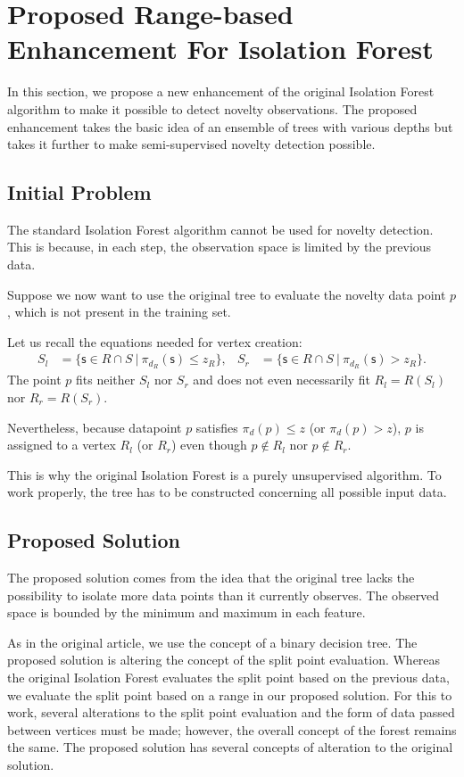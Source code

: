 \section{Proposed Range-based Enhancement For Isolation Forest}
\label{sec:novelty_isolation_forest}
In this section, we propose a new enhancement of the original Isolation Forest algorithm to make it possible to detect novelty observations.
The proposed enhancement takes the basic idea of an ensemble of trees with various depths but takes it further to make semi-supervised novelty detection possible.

\subsection{Initial Problem}
\label{sec:InitialProblem}
 The standard Isolation Forest algorithm cannot be used for novelty detection. This is because, in each step, the observation space is limited by the previous data.


Suppose we now want to use the original tree to evaluate the novelty data point $p$, which is not present in the training set.

Let us recall the equations needed for vertex creation:
\begin{align*}
S_l &= \{ \mathsf{s} \in{R \cap S}\ |\ \pi_{d_R}(\mathsf{s})\le z_R\},&
S_r &= \{ \mathsf{s} \in{R \cap S}\ |\ \pi_{d_R}(\mathsf{s}) > z_R\}.
\end{align*}
The point $p$ fits neither $S_l$ nor $S_r$ and does not even necessarily fit $R_l = R(S_l)$ nor $R_r = R(S_r)$. 

Nevertheless, because datapoint $p$ satisfies  $\pi_d(p) \le z$ (or $\pi_d(p) > z$), $p$ is assigned to a vertex $R_l$ (or $R_r$) even though $p \notin R_l$ nor $p \notin R_r$.

This is why the original Isolation Forest is a purely unsupervised algorithm. To work properly, the tree has to be constructed concerning all possible input data.

\subsection{Proposed Solution}
The proposed solution comes from the idea that the original tree lacks the possibility to isolate more data points than it currently observes.
The observed space is bounded by the minimum and maximum in each feature.

As in the original article, we use the concept of a binary decision tree. The proposed solution is altering the concept of the split point evaluation. Whereas the original Isolation Forest evaluates the split point based on the previous data, we
evaluate the split point based on a range in our proposed solution. For this to work, several alterations to the split point evaluation and the form of data passed between vertices must be made; however, the overall concept of the forest remains the same.
The proposed solution has several concepts of alteration to the original solution.


